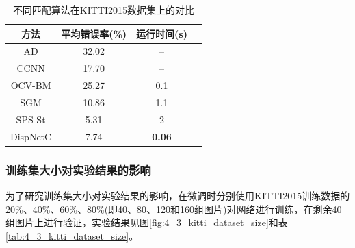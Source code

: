 \begin{table}[!htb]
	\centering
	\caption{不同匹配算法在KITTI2015数据集上的对比}
	\label{tab:4_3_cmp_kitti}
		\begin{tabular}{|c|c|c|c|}\hline
			方法             & 平均错误率(\%) & 运行时间(s) \\\hline
			AD               & 32.02                 & --      \\
			CCNN          & 17.70                  & --      \\
			OCV-BM      & 25.27                  &  0.1    \\
			SGM            & 10.86                 &  1.1     \\
			SPS-St         & 5.31                    & 2         \\
			DispNetC     & 7.74                   & \textbf{0.06}  \\\hline
		\end{tabular}
	
\end{table}


\subsubsection{训练集大小对实验结果的影响}
为了研究训练集大小对实验结果的影响，在微调时分别使用KITTI2015训练数据的20\%、40\%、60\%、80\%(即40、80、120和160组图片)对网络进行训练，在剩余40组图片上进行验证，实验结果见图\ref{fig:4_3_kitti_dataset_size}和表\ref{tab:4_3_kitti_dataset_size}。


